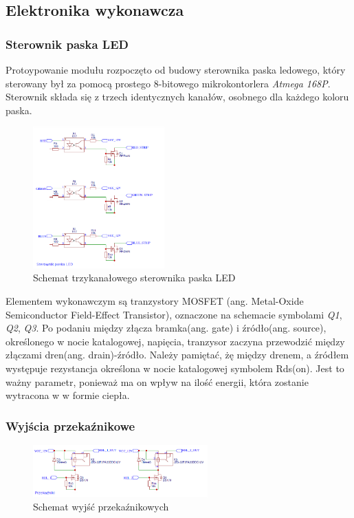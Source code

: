\documentclass[12pt, eng, twoside, openany, final]{mgr}
\begin{document}
        \subsection{Elektronika wykonawcza}
            \subsubsection{Sterownik paska LED}
                Protoypowanie modułu rozpoczęto od budowy sterownika paska ledowego, który sterowany był za pomocą prostego 8-bitowego mikrokontorlera \emph{Atmega 168P}. Sterownik składa się z trzech identycznych kanałów, osobnego dla każdego koloru paska. 
                \begin{figure}[H]
                \begin{center}
                    \includegraphics[width=0.45\textwidth]{sterownik.png}
                    \caption{Schemat trzykanałowego sterownika paska LED}
                \end{center}
                \end{figure}
                Elementem wykonawczym są tranzystory MOSFET (ang. Metal-Oxide Semiconductor Field-Effect Transistor), oznaczone na schemacie symbolami \emph{Q1}, \emph{Q2}, \emph{Q3}. Po podaniu między złącza bramka(ang. gate) i źródło(ang. source), określonego w nocie katalogowej, napięcia, tranzysor zaczyna przewodzić między złączami dren(ang. drain)-źródło. Należy pamiętać, żę między drenem, a źródłem występuje rezystancja określona w nocie katalogowej symbolem Rds(on). Jest to ważny parametr, ponieważ ma on wpływ na ilość energii, która zostanie wytracona w w formie ciepła. 
        
            \subsubsection{Wyjścia przekaźnikowe}
                \begin{figure}[H]
                \begin{center}
                    \includegraphics[width=0.6\textwidth]{przekazniki.png}
                    \caption{Schemat wyjść przekaźnikowych}
                \end{center}
                \end{figure}
\end{document}
